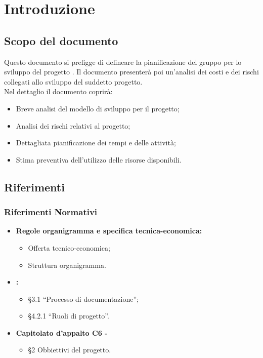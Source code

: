 \documentclass[PianoDiProgetto.tex]{subfiles}
\begin{document}
\chapter{Introduzione}

\section{Scopo del documento}
Questo documento si prefigge di delineare la pianificazione del gruppo \gruppo per lo sviluppo del progetto \progetto. Il documento presenterà poi un'analisi dei costi e dei rischi collegati allo sviluppo del suddetto progetto.\\
Nel dettaglio il documento coprirà:
\begin{itemize}
	\item Breve analisi del modello di sviluppo per il progetto;
	\item Analisi dei rischi relativi al progetto;
	\item Dettagliata pianificazione dei tempi e delle attività;
	\item Stima preventiva dell'utilizzo delle risorse disponibili.
\end{itemize}

\scopoProdotto

\glossExpl

\section{Riferimenti}
\subsection{Riferimenti Normativi}
\begin{itemize}
	\item \textbf{Regole organigramma e specifica tecnica-economica:} \\
		  \begin{itemize}
		  	\item Offerta tecnico-economica;
		  	\item Struttura organigramma.
		  \end{itemize}
	\item \textbf{\ndp \vrdue:}
	 \begin{itemize}
	 	\item \S3.1 ``Processo di documentazione'';
	  	\item \S4.2.1 ``Ruoli di progetto''.
	 \end{itemize}
 	\item \textbf{Capitolato d'appalto C6 - \progetto}\\
 		\begin{itemize}
 			\item \S2 Obbiettivi del progetto.
 		\end{itemize}
	
\end{itemize}
\end{document}
